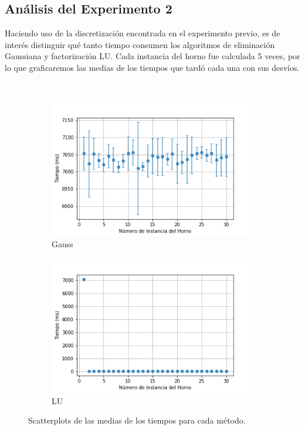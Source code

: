 \newpage

\subsection{Análisis del Experimento 2}

Haciendo uso de la discretización encontrada en el experimento previo, es de interés distinguir qué tanto tiempo consumen los algoritmos de eliminación Gaussiana y factorización LU. Cada instancia del horno fue calculada 5 veces, por lo que graficaremos las medias de los tiempos que tardó cada una con sus desvíos. 

\

\begin{figure}[H]
    \centering
    \begin{subfigure}{0.45\linewidth}
        \centering
        \includegraphics[scale=0.45]{img/EXP2/tiempos_gauss.png}
        \caption{Gauss}
        \label{fig:tiempo_gauss}
    \end{subfigure}
    \hfill
    \begin{subfigure}{0.45\linewidth}
        \centering
        \includegraphics[scale=0.45]{img/EXP2/tiempos_lu.png}
        \caption{LU}
        \label{fig:tiempo_lu}
    \end{subfigure}
    \caption{Scatterplots de las medias de los tiempos para cada método.}
\end{figure}

